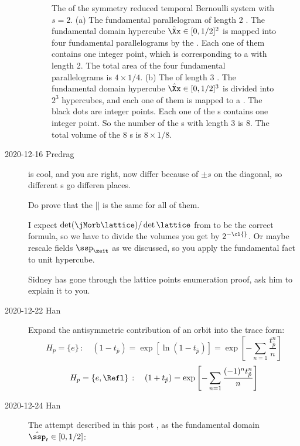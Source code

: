 \begin{description}
\begin{figure}
  \caption{\label{fig:fig_d_2half_jacob}
The {\fundPip} of the symmetry reduced temporal Bernoulli system with $s=2$.
(a)
The fundamental parallelogram of length 2 {\lattstate}. The fundamental domain hypercube
$\hat{\Xx}\in[0,1/2]^2$ is mapped into four fundamental
parallelograms by the {\jacobianOrb}. Each one of them contains one integer point, which is
corresponding to a {\lattstate} with length 2. The total area of the four fundamental parallelograms is $4 \times 1/4$.
(b)
The {\fundPip} of length 3 {\lattstate}. The fundamental domain
hypercube $\hat{\Xx}\in[0,1/2]^3$ is divided into $2^3$ hypercubes, and
each one of them is mapped to a {\fundPip}. The black dots are integer
points. Each one of the {\fundPip s} contains one integer point. So the
number of the {\lattstate}s with length 3 is 8. The total
volume of the 8 {\fundPip}s is $8 \times 1/8$.
          }
\end{figure}

    \item[2020-12-16 Predrag]
 is cool, and you are right, now
{\jacobianOrbs} differ because of $\pm{s}$ on the diagonal,
so different {\fundPip s} go differen places.

Do prove that the |{\HillDet}| is the same for all of them.

I expect $\det({\mathbf{\jMorb}\lattice)}/\det{\lattice}$
from
 to be the correct formula, so we have to divide
the volumes you get by $2^{-\cl{}}$. Or maybe rescale fields $\ssp_\zeit$
as we discussed, so you apply the fundamental fact to unit hypercube.

Sidney has gone through the lattice points
enumeration proof, ask him
to explain it to you.

    \item[2020-12-22 Han]
Expand the antisymmetric contribution of an orbit into the trace form:
\[
H_p = \{e\} \, : \quad (1-t_{\hat{p}}) =
\exp[\ln(1-t_{\hat{p}})] = \exp\left[-\sum_{n=1} \frac{t_{\hat{p}}^n}{n}\right]
\]
\[
H_p = \{e,\Refl\} \, : \quad
(1+t_{\hat{p}}) = \exp\left[-\sum_{n=1} \frac{(-1)^n t_{\hat{p}}^n}{n}\right]
\]



    \item[2020-12-24 Han]
The attempt described in this post , as the fundamental domain
 $\hat{\ssp}_{t} \in [0,1/2]$:


\end{description}
